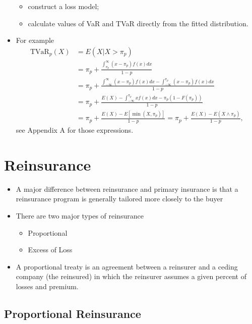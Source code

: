 \documentclass[]{book}
\begin{document}
\begin{itemize}
  \begin{itemize}
  \item
    construct a loss model;
  \item
    calculate values of VaR and TVaR directly from the fitted
    distribution.
  \end{itemize}
\item
  For example \[\begin{aligned}
    \text{TVaR}_p(X) &= E(X|X>\pi_p) \\
  &= \pi_p + \frac{\int_{\pi_p}^{\infty} (x-\pi_p) f(x) dx}{1-p} \\
  &= \pi_p + \frac{\int_{-\infty}^{\infty} (x-\pi_p) f(x) dx -\int_{-\infty}^{\pi_p} (x-\pi_p) f(x) dx }{1-p} \\
  &= \pi_p + \frac{E(X)-\int_{-\infty}^{\pi_p} xf(x) dx -\pi_p (1-F(\pi_p))}{1-p} \\
  &= \pi_p + \frac{E(X) - E[\min{(X,\pi_p)}]}{1-p} = \pi_p + \frac{E(X)-E(X \wedge \pi_p)}{1-p},\end{aligned}\]
  see Appendix A for those expressions.
\end{itemize}

\section{Reinsurance}\label{reinsurance-1}

\begin{itemize}
\item
  A major difference between reinsurance and primary insurance is that a
  reinsurance program is generally tailored more closely to the buyer
\item
  There are two major types of reinsurance

  \begin{itemize}
  \item
    Proportional
  \item
    Excess of Loss
  \end{itemize}
\item
  A proportional treaty is an agreement between a reinsurer and a ceding
  company (the reinsured) in which the reinsurer assumes a given percent
  of losses and premium.
\end{itemize}

\subsection{Proportional Reinsurance}\label{proportional-reinsurance}
\end{document}
